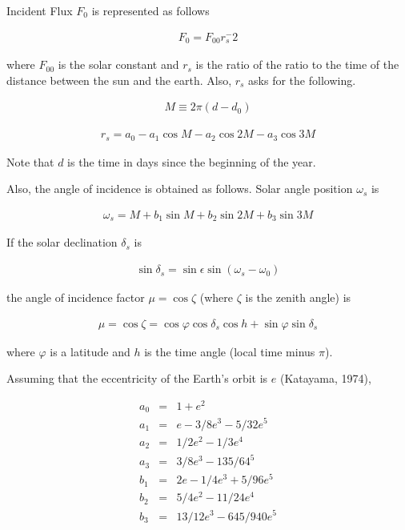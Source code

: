 Incident Flux \(F_0\) is represented as follows

\begin{eqnarray}
F_0 = F_00 r_s^-2 
\end{eqnarray}

where \(F_{00}\) is the solar constant and \(r_s\) is the ratio of the ratio to the time of the distance between the sun and the earth. Also, \(r_s\) asks for the following.   

\begin{eqnarray}
  M \equiv 2 \pi ( d - d_0 ) 
\end{eqnarray}

\begin{eqnarray}
  r_s = a_0 - a_1 \cos M - a_2 \cos 2M - a_3 \cos 3M
\end{eqnarray}

Note that \(d\) is the time in days since the beginning of the year.

Also, the angle of incidence is obtained as follows. Solar angle position 
\(\omega_s\) is

\begin{eqnarray}
  \omega_s = M + b_1 \sin M + b_2 \sin 2M + b_3 \sin 3M
\end{eqnarray}

If the solar declination \(\delta_s\) is

\begin{eqnarray}
  \sin \delta_s = \sin \epsilon \sin ( \omega_s - \omega_0 ) 
\end{eqnarray}

the angle of incidence factor \(\mu = \cos \zeta\) (where \(\zeta\)
is the zenith angle) is

\begin{eqnarray}
\mu = \cos \zeta = \cos \varphi \cos \delta_s \cos h
                 + \sin \varphi \sin \delta_s
\end{eqnarray}

where \(\varphi\) is a latitude and \(h\) is the time angle (local time minus
\(\pi\)).

Assuming that the eccentricity of the Earth's orbit is \(e\) (Katayama,
1974),

\begin{eqnarray}
   a_0 & = &  1 + e^2 \\
   a_1 & = &  e - 3/8 e^3 - 5/32 e^5 \\
   a_2 & = &  1/2 e^2 - 1/3e^4 \\
   a_3 & = &  3/8 e^3 - 135/64^5 \\
   b_1 & = & 2e - 1/4 e^3 + 5/96 e^5 \\
   b_2 & = & 5/4 e^2 - 11/24 e^4 \\
   b_3 & = & 13/12 e^3 - 645/940 e^5 \\
\end{eqnarray}

